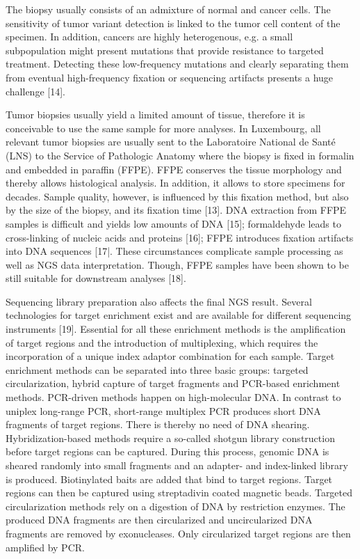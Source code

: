 The biopsy usually consists of an admixture of normal and cancer cells. The
sensitivity of tumor variant detection is linked to the tumor cell content of
the specimen. In addition, cancers are highly heterogenous, e.g. a small
subpopulation might present mutations that provide resistance to targeted
treatment. Detecting these low-frequency mutations and clearly separating them
from eventual high-frequency fixation or sequencing artifacts presents a huge
challenge [14].

Tumor biopsies usually yield a limited amount of tissue, therefore it is
conceivable to use the same sample for more analyses. In Luxembourg, all
relevant tumor biopsies are usually sent to the Laboratoire National de Santé
(LNS) to the Service of Pathologic Anatomy where the biopsy is fixed in formalin
and embedded in paraffin (FFPE). FFPE conserves the tissue morphology and
thereby allows histological analysis. In addition, it allows to store specimens
for decades. Sample quality, however, is influenced by this fixation method, but
also by the size of the biopsy, and its fixation time [13]. DNA extraction from
FFPE samples is difficult and yields low amounts of DNA [15]; formaldehyde leads
to cross-linking of nucleic acids and proteins [16]; FFPE introduces fixation
artifacts into DNA sequences [17|. These circumstances complicate sample
processing as well as NGS data interpretation. Though, FFPE samples have been
shown to be still suitable for downstream analyses [18].

Sequencing library preparation also affects the final NGS result. Several
technologies for target enrichment exist and are available for different
sequencing instruments [19]. Essential for all these enrichment methods is the
amplification of target regions and the introduction of multiplexing, which
requires the incorporation of a unique index adaptor combination for each
sample. Target enrichment methods can be separated into three basic groups:
targeted circularization, hybrid capture of target fragments and PCR-based
enrichment methods. PCR-driven methods happen on high-molecular DNA. In contrast
to uniplex long-range PCR, short-range multiplex PCR produces short DNA
fragments of target regions. There is thereby no need of DNA shearing.
Hybridization-based methods require a so-called shotgun library construction
before target regions can be captured. During this process, genomic DNA is
sheared randomly into small fragments and an adapter- and index-linked library
is produced. Biotinylated baits are added that bind to target regions. Target
regions can then be captured using streptadivin coated magnetic beads. Targeted
circularization methods rely on a digestion of DNA by restriction enzymes. The
produced DNA fragments are then circularized and uncircularized DNA fragments
are removed by exonucleases. Only circularized target regions are then amplified
by PCR.

